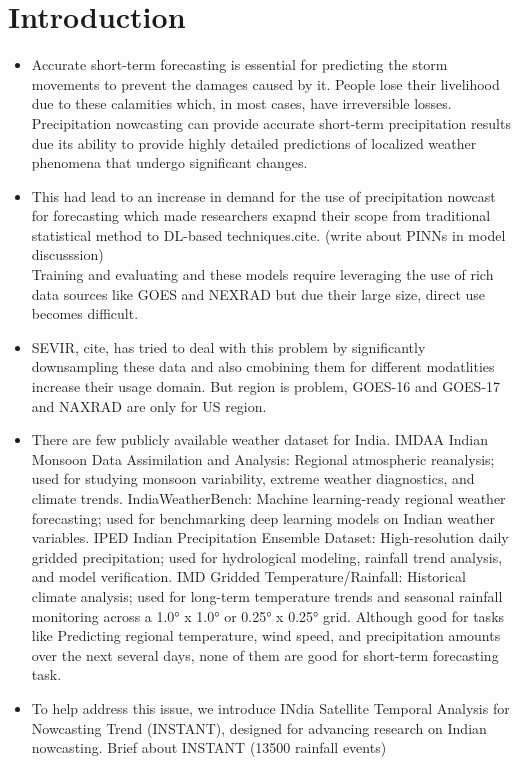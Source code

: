 \documentclass{article}
\begin{document}
\section{Introduction}
\begin{itemize}
  \item Accurate short-term forecasting is essential for predicting the storm movements to prevent the damages caused by it. People lose their livelihood due to these calamities which, in most cases, have irreversible losses. 
Precipitation nowcasting can provide accurate short-term precipitation results due its ability to provide highly detailed predictions of localized weather phenomena that undergo significant changes.
  \item This had lead to an increase in demand for the use of precipitation nowcast for forecasting which made researchers exapnd their scope from traditional statistical method to DL-based techniques.cite. (write about PINNs in model discusssion)\\
Training and evaluating and these models require leveraging the use of rich data sources like GOES and NEXRAD but due their large size, direct use becomes difficult. 
  \item  SEVIR, cite, has tried to deal with this problem by significantly downsampling these data and also cmobining them for different modatlities increase their usage domain. But region is problem, GOES-16 and GOES-17 and NAXRAD are only for US region.
  \item  There are few publicly available weather dataset for India. 
IMDAA Indian Monsoon Data Assimilation and Analysis: Regional atmospheric reanalysis; used for studying monsoon variability, extreme weather diagnostics, and climate trends.
IndiaWeatherBench: Machine learning-ready regional weather forecasting; used for benchmarking deep learning models on Indian weather variables.
IPED Indian Precipitation Ensemble Dataset: High-resolution daily gridded precipitation; used for hydrological modeling, rainfall trend analysis, and model verification.
IMD Gridded Temperature/Rainfall: Historical climate analysis; used for long-term temperature trends and seasonal rainfall monitoring across a 1.0° x 1.0° or 0.25° x 0.25° grid.
Although good for tasks like Predicting regional temperature, wind speed, and precipitation amounts over the next several days, none of them are good for short-term forecasting task. 
  \item To help address this issue, we introduce INdia Satellite Temporal Analysis for Nowcasting Trend (INSTANT), designed for advancing research on Indian nowcasting. Brief about INSTANT (13500 rainfall events)


\end{itemize}
\end{document}
